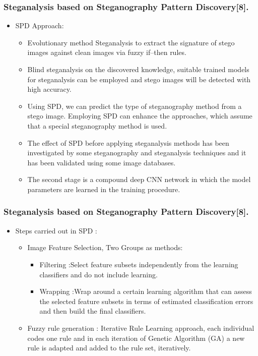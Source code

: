 \documentclass{beamer} %
\theoremstyle{definition} %
\begin{document}
\begin{frame}
\frametitle{Steganalysis based on Steganography Pattern Discovery[8].}
\begin{itemize}
	\item SPD Approach:
	\begin{itemize}
		\item Evolutionary method Steganalysis to extract the signature of stego images against clean images via fuzzy if–then rules.
		
		\item Blind steganalysis on the discovered knowledge, suitable trained models for steganalysis can be employed and stego images will be detected with high accuracy. 
		\item Using SPD, we can predict the type of steganography method from a stego image. Employing SPD can enhance the approaches, which
		assume that a special steganography method is used. 
		\item The effect of SPD before applying steganalysis methods has been investigated by some steganography and steganalysis techniques and it has been validated using some image databases.
		\item The second stage is a compound deep CNN network in which the model parameters are learned in the training procedure.
	\end{itemize}
\end{itemize}
\end{frame}

\begin{frame}
\frametitle{Steganalysis based on Steganography Pattern Discovery[8].}
\begin{itemize}
	\item Steps carried out in SPD : 
	\begin{itemize}
		\item Image Feature Selection, Two Groups as methods: 
		\begin{itemize}
			\item Filtering :Select feature subsets independently from the learning classifiers and do not include learning.
			\item Wrapping :Wrap around a certain learning algorithm that can
			assess the selected feature subsets in terms of estimated classification errors and then build the final classifiers.
		\end{itemize}
		\item Fuzzy rule generation : Iterative Rule Learning approach, each individual codes one rule and in each iteration of Genetic Algorithm (GA) a new rule is adapted and added to the rule set, iteratively.
	\end{itemize} 
\end{itemize}
\end{frame}
\end{document}
